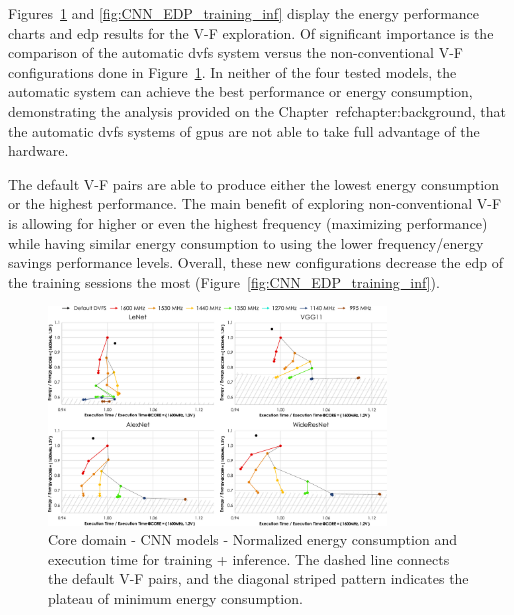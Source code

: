 Figures~\ref{fig:CNN_Behaviour_training_inf} and \ref{fig:CNN_EDP_training_inf} display the energy performance charts and \acrshort{edp} results for the V-F exploration. Of significant importance is the comparison of the automatic  \acrshort{dvfs} system versus the non-conventional V-F configurations done in Figure~\ref{fig:CNN_Behaviour_training_inf}. In neither of the four tested models, the automatic system can achieve the best performance or energy consumption, demonstrating the analysis provided on the Chapter~ref{chapter:background}, that the automatic \acrshort{dvfs} systems of \acrshort{gpu}s are not able to take full advantage of the hardware. 

The default V-F pairs are able to produce either the lowest energy consumption or the highest performance. 
The main benefit of exploring non-conventional V-F is allowing for higher or even the highest frequency (maximizing performance) while having similar energy consumption to using the lower frequency/energy savings performance levels.
Overall, these new configurations decrease the \acrshort{edp} of the training sessions the most (Figure~\ref{fig:CNN_EDP_training_inf}).



\begin{figure}[!htb]
    \centering
        \includegraphics[width=0.8\textwidth]{Figures/Application To Deep Learning/CNN_behaviour.pdf}
        \caption{Core domain - CNN models - Normalized energy consumption and execution time for training + inference. The dashed line connects the default V-F pairs, and the diagonal striped pattern indicates the plateau of minimum energy consumption.}
    \label{fig:CNN_Behaviour_training_inf}
\end{figure}

